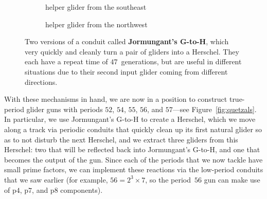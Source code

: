 \begin{figure}[!htb]
	\centering
	\begin{subfigure}{0.48\textwidth}
		\centering
		\caption{helper glider from the southeast}
		\label{fig:2G_to_Ha}
	\end{subfigure} \hfill \begin{subfigure}{.48\textwidth}
		\centering
		\caption{helper glider from the northwest}
		\label{fig:2G_to_Hb}
	\end{subfigure}
	\caption{Two versions of a conduit called \textbf{Jormungant's G-to-H}, which very quickly and cleanly turn a pair of gliders into a Herschel. They each have a repeat time of $47$~generations, but are useful in different situations due to their second input glider coming from different directions.}\label{fig:2G_to_H}
\end{figure}

With these mechanisms in hand, we are now in a position to construct true-period glider guns with periods $52$, $54$, $55$, $56$, and $57$---see Figure~\ref{fig:quetzals}. In particular, we use Jormungant's G-to-H to create a Herschel, which we move along a track via periodic conduits that quickly clean up its first natural glider so as to not disturb the next Herschel, and we extract three gliders from this Herschel: two that will be reflected back into Jormungant's G-to-H, and one that becomes the output of the gun. Since each of the periods that we now tackle have small prime factors, we can implement these reactions via the low-period conduits that we saw earlier (for example, $56 = 2^3 \times 7$, so the period~$56$ gun can make use of p$4$, p$7$, and p$8$ components).


